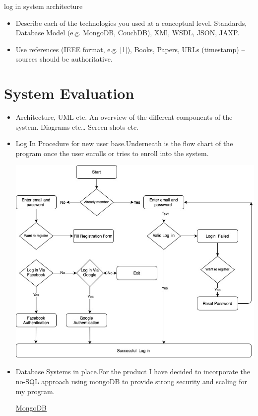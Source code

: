  
 
 log in system architecture 
 
 
 
 
 
\begin{itemize}
\item Describe each of the technologies you used at a conceptual level. Standards, Database Model (e.g. MongoDB, CouchDB), XMl, WSDL, JSON, JAXP.
\item Use references (IEEE format, e.g. [1]), Books, Papers, URLs (timestamp) – sources should be authoritative. 
\end{itemize}


\chapter{System Evaluation}




\begin{itemize}
\item Architecture, UML etc. An overview of the different components of the system. Diagrams etc… Screen shots etc.




\item Log In Procedure for new user base.Underneath is the flow chart of the program once the user enrolls or tries to enroll into the system.


{\includegraphics[width=1.0\textwidth]{final-year-project-template-master/img/Flowchart.jpg}}



\item Database Systems in place.For the product I have decided to incorporate the no-SQL approach using mongoDB to provide strong security and scaling for my program.

\href{https://medium.com/@rsk.saikrishna/when-to-use-mongodb-rather-than-mysql-d03ceff2e922}{MongoDB} 

\end{itemize}


